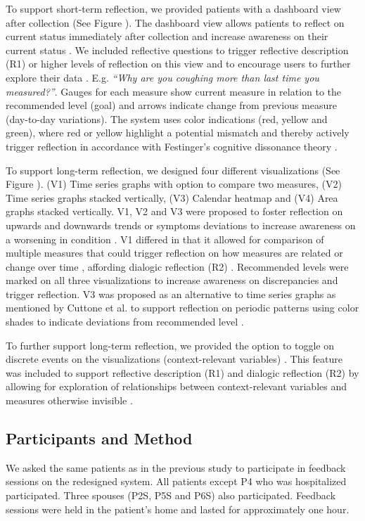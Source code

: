 To support short-term reflection, we provided patients with a dashboard view after collection (See Figure ). The dashboard view allows patients to reflect on current status immediately after collection and increase awareness on their current status \cite{Cutone, Muller}. We included reflective questions to trigger reflective description (R1) or higher levels of reflection on this view and to encourage users to further explore their data \cite{Fleck, Muller}. E.g. \textit{“Why are you coughing more than last time you measured?”}. Gauges for each measure show current measure in relation to the recommended level (goal) and arrows indicate change from previous measure (day-to-day variations). The system uses color indications (red, yellow and green), where red or yellow highlight a potential mismatch and thereby actively trigger reflection in accordance with Festinger’s cognitive dissonance theory \cite{Rivera}.  

To support long-term reflection, we designed four different visualizations (See Figure ). (V1) Time series graphs with option to compare two measures, (V2) Time series graphs stacked vertically, (V3) Calendar heatmap and (V4) Area graphs stacked vertically. V1, V2 and V3 were proposed to foster reflection on upwards and downwards trends or symptoms deviations to increase awareness on a worsening in condition \cite{Rivera}. V1 differed in that it allowed for comparison of multiple measures that could trigger reflection on how measures are related or change over time \cite{Cuttone}, affording dialogic reflection (R2) \cite{Fleck}. Recommended levels were marked on all three visualizations to increase awareness on discrepancies \cite{Li2010} and trigger reflection. V3 was proposed as an alternative to time series graphs as mentioned by Cuttone et al. to support reflection on periodic patterns using color shades to indicate deviations from recommended level \cite{Cuttone, Li2010}.   

To further support long-term reflection, we provided the option to toggle on discrete events on the visualizations (context-relevant variables) \cite{Sorensen}. This feature was included to support reflective description (R1) and dialogic reflection (R2) by allowing for exploration of relationships between context-relevant variables and measures otherwise invisible \cite{Fleck}.   

\subsection{Participants and Method}
We asked the same patients as in the previous study to participate in feedback sessions on the redesigned system. All patients except P4 who was hospitalized participated. Three spouses (P2S, P5S and P6S) also participated. Feedback sessions were held in the patient’s home and lasted for approximately one hour. 

